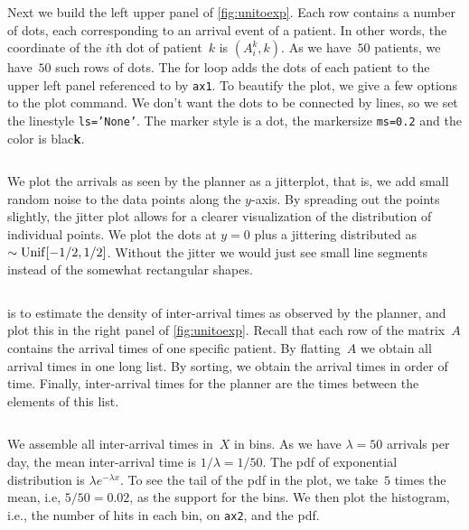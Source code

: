 \documentclass[stochastic-or.tex]{subfiles}
\begin{document}
Next we build the left upper panel of \cref{fig:unitoexp}.
Each row contains a number of dots, each  corresponding to an arrival event of a patient.
In other words, the coordinate of the $i$th dot of patient~$k$ is $(A_{i}^k, k)$.
As we have~$50$ patients, we have~$50$ such rows of dots.
The for loop adds the dots of each patient to the upper left panel referenced to by \texttt{ax1}.
To beautify the plot, we give a few options to the plot command.
We don't want the dots to be connected by lines, so we set the linestyle \texttt{ls='None'}.
The marker style is a dot, the markersize \texttt{ms=0.2} and the color is blac\textbf{k}.
\inputminted[firstline=47, lastline=51]{python}{../code/IBD_simulations.py} %


We plot the arrivals as seen by the planner as a jitterplot, that is, we add small random noise to the data points along the $y$-axis.
By spreading out the points slightly, the jitter plot allows for a clearer visualization of the distribution of individual points.
We plot the dots at $y=0$ plus a jittering distributed as $\sim\mathrm{Unif}[-1/2, 1/2]$.
Without the jitter we would just see small line segments instead of the somewhat rectangular shapes.
\inputminted[firstline=55, lastline=58]{python}{../code/IBD_simulations.py} %


 is to estimate the density of inter-arrival times as observed by the planner, and plot this in the right panel of \cref{fig:unitoexp}.
Recall that each row of the matrix~$A$ contains the arrival times of one specific patient.
By flatting~$A$ we obtain all arrival times in one long list.
By sorting, we obtain the arrival times in order of time.
Finally, inter-arrival times for the planner are the times between the elements of this list.
\inputminted[firstline=63, lastline=64]{python}{../code/IBD_simulations.py} %

We assemble all inter-arrival times in~$X$ in bins.
As we have $\lambda=50$ arrivals per day, the mean inter-arrival time is $1/\lambda = 1/50$.
The pdf of exponential distribution is $\lambda e^{-\lambda x}$.
To see the tail of the pdf in the plot, we take~$5$ times the mean, i.e, $5/50 = 0.02$, as the support for the bins.
We then plot the histogram, i.e., the number of hits in each bin, on \texttt{ax2}, and the pdf.
\inputminted[firstline=68, lastline=72]{python}{../code/IBD_simulations.py} %
\end{document}
